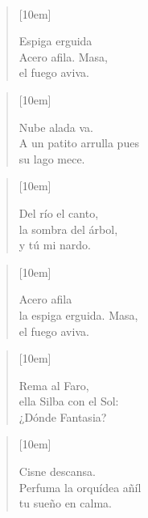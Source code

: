 \\[0.1cm]

\begin{verse}[10em]
	\begin{altverse}
		Espiga erguida\\
		Acero afila. Masa,\\
		el fuego aviva.\\
	\end{altverse}
\end{verse}

\begin{verse}[10em]
	\begin{altverse}
		Nube alada va.\\
		A un patito arrulla pues\\
		su lago mece.\\
	\end{altverse}
\end{verse}

\begin{verse}[10em]
	\begin{altverse}
		Del río el canto,\\
		la sombra del árbol,\\
		y tú mi nardo.\\
	\end{altverse}
\end{verse}

\begin{verse}[10em]
	\begin{altverse}

		Acero afila\\
		la espiga erguida. Masa,\\
		el fuego aviva.\\
	\end{altverse}
\end{verse}

\begin{verse}[10em]
	\begin{altverse}
		Rema al Faro,\\
		ella Silba con el Sol:\\
		¿Dónde Fantasia?\\
	\end{altverse}
\end{verse}

\begin{verse}[10em]
	\begin{altverse}
		Cisne descansa.\\
		Perfuma la orquídea añíl\\
		tu sueño en calma.\\
	\end{altverse}
\end{verse}

